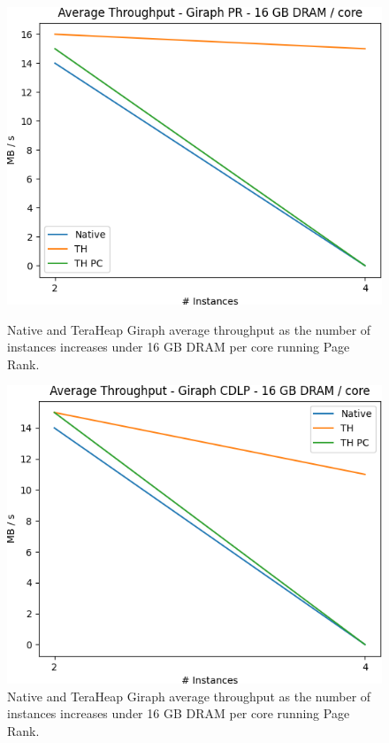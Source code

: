 \begin{figure}[thbp]
        \centering
        \includegraphics[width=\linewidth]{./fig/G_PR_128_THR.png}
    \caption{Native and TeraHeap Giraph average throughput
        as the number of instances increases under 16 GB DRAM per core running Page Rank.}
        \label{fig:g_pr128_thr}
        \includegraphics[width=\linewidth]{./fig/G_CDLP_128_THR.png}
    \caption{Native and TeraHeap Giraph average throughput
        as the number of instances increases under 16 GB DRAM per core running Page Rank.}
	\label{fig:g_cdlp128_thr}
\end{figure}

